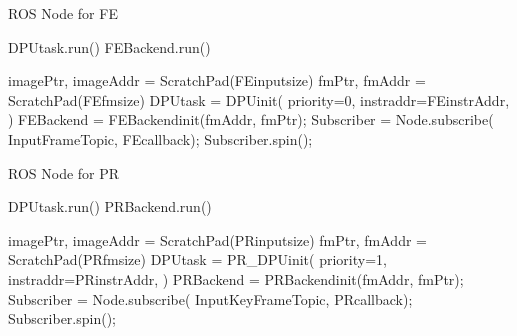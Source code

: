\begin{algorithm}[h]
    \caption{ ROS Node for FE }
    \label{code:FE}
    \begin{algorithmic}[1]
        \State DPUtask.run()
        \State FEBackend.run()
        \EndFunction

        \State imagePtr, imageAddr = ScratchPad(FEinputsize)
        \State fmPtr, fmAddr = ScratchPad(FEfmsize)
        \State DPUtask = DPUinit({\color{red}  priority=0},{\color{blue} instraddr=FEinstrAddr, }
        \State \qquad \qquad \qquad {} ) 
        \State FEBackend = FEBackendinit({\color{blue}fmAddr, fmPtr});
        \State Subscriber = Node.subscribe( InputFrameTopic, FEcallback);
        \State Subscriber.spin();
        \EndFunction
    \end{algorithmic}
\end{algorithm}

\begin{algorithm}[h]
    \caption{ ROS Node for PR }
    \label{code:PR}
    \begin{algorithmic}[1]
        \State DPUtask.run()
        \State PRBackend.run()
        \EndFunction

        \State imagePtr, imageAddr = ScratchPad(PRinputsize)
        \State fmPtr, fmAddr = ScratchPad(PRfmsize)
        \State DPUtask = PR\_DPUinit( {\color{red} priority=1},{\color{blue} instraddr=PRinstrAddr}, 
        \State \qquad \qquad \qquad {} ) 
        \State PRBackend = PRBackendinit({\color{blue}fmAddr, fmPtr});
        \State Subscriber = Node.subscribe( InputKeyFrameTopic, PRcallback);
        \State Subscriber.spin();
        \EndFunction
    \end{algorithmic}
\end{algorithm}

